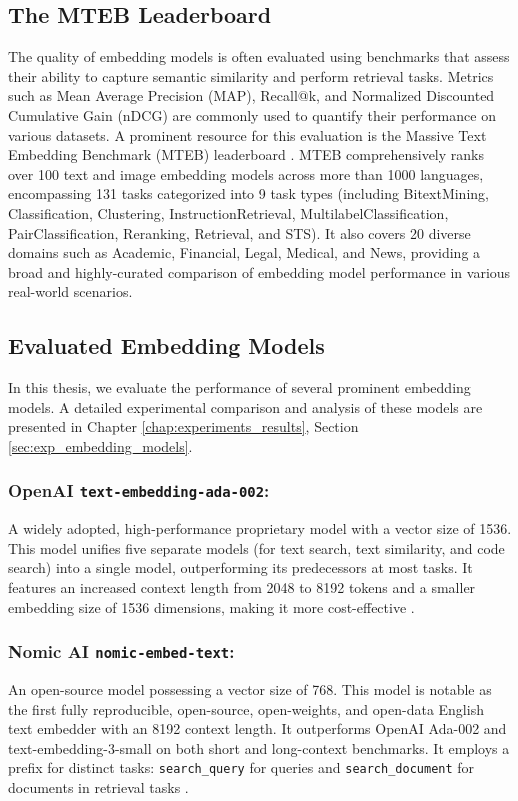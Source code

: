 \subsection{The MTEB Leaderboard}
The quality of embedding models is often evaluated using benchmarks that assess their ability to capture semantic similarity and perform retrieval tasks. Metrics such as Mean Average Precision (MAP), Recall@k, and Normalized Discounted Cumulative Gain (nDCG) are commonly used to quantify their performance on various datasets. A prominent resource for this evaluation is the Massive Text Embedding Benchmark (MTEB) leaderboard \autocite{mteb_leaderboard_2025}. MTEB comprehensively ranks over 100 text and image embedding models across more than 1000 languages, encompassing 131 tasks categorized into 9 task types (including BitextMining, Classification, Clustering, InstructionRetrieval, MultilabelClassification, PairClassification, Reranking, Retrieval, and STS). It also covers 20 diverse domains such as Academic, Financial, Legal, Medical, and News, providing a broad and highly-curated comparison of embedding model performance in various real-world scenarios.
\subsection{Evaluated Embedding Models}
In this thesis, we evaluate the performance of several prominent embedding models.
A detailed experimental comparison and analysis of these models are presented in Chapter \ref{chap:experiments_results}, Section \ref{sec:exp_embedding_models}.

\subsubsection{OpenAI \texttt{text-embedding-ada-002}:} A widely adopted, high-performance proprietary model with a vector size of 1536. This model unifies five separate models (for text search, text similarity, and code search) into a single model, outperforming its predecessors at most tasks. It features an increased context length from 2048 to 8192 tokens and a smaller embedding size of 1536 dimensions, making it more cost-effective \autocite{openai2022ada002}.

\subsubsection{Nomic AI \texttt{nomic-embed-text}:} An open-source model possessing a vector size of 768. This model is notable as the first fully reproducible, open-source, open-weights, and open-data English text embedder with an 8192 context length. It outperforms OpenAI Ada-002 and text-embedding-3-small on both short and long-context benchmarks. It employs a prefix for distinct tasks: \texttt{search\_query} for queries and \texttt{search\_document} for documents in retrieval tasks \autocite{nussbaum2025nomicembedtrainingreproducible}.

